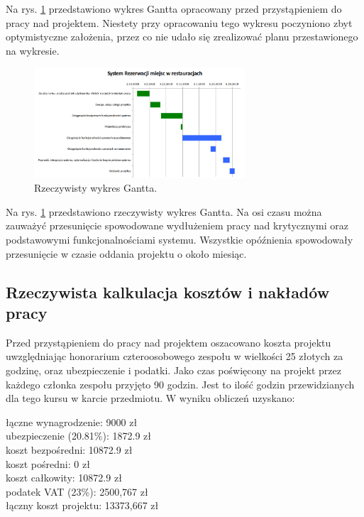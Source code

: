 \documentclass{article}
\newcommand\tab[1][1cm]{\hspace*{#1}}
\begin{document}
Na rys. \ref{fig:gantt} przedstawiono wykres Gantta opracowany przed przystąpieniem do pracy nad projektem. Niestety przy opracowaniu tego wykresu poczyniono zbyt optymistyczne założenia, przez co nie udało się zrealizować planu przestawionego na wykresie.

\begin{figure}[h]
\centering
	\includegraphics[width=0.70\textwidth]{gantt_real.png}
	\caption{Rzeczywisty wykres Gantta.}
	\label{fig:gantt}
\end{figure}

Na rys. \ref{fig:gantt} przedstawiono rzeczywisty wykres Gantta. Na osi czasu można zauważyć przesunięcie spowodowane wydłużeniem pracy nad krytycznymi oraz podstawowymi funkcjonalnościami systemu. Wszystkie opóźnienia spowodowały przesunięcie w czasie oddania projektu o około miesiąc.


\subsection{Rzeczywista kalkulacja kosztów i nakładów pracy}

Przed przystąpieniem do pracy nad projektem oszacowano koszta projektu uwzględniając honorarium czteroosobowego zespołu w wielkości 25 złotych za godzinę, oraz ubezpieczenie i podatki. Jako czas poświęcony na projekt przez każdego członka zespołu przyjęto 90 godzin. Jest to ilość godzin przewidzianych dla tego kursu w karcie przedmiotu. W wyniku obliczeń uzyskano:

\hspace*{0.35cm} łączne wynagrodzenie: 9000 zł \\
\tab ubezpieczenie (20.81\%): 1872.9 zł \\
\tab koszt bezpośredni: 10872.9 zł \\
\tab koszt pośredni: 0 zł \\
\tab koszt całkowity: 10872.9 zł \\
\tab podatek VAT (23\%): 2500,767 zł \\
\tab łączny koszt projektu: 13373,667 zł
\end{document}
